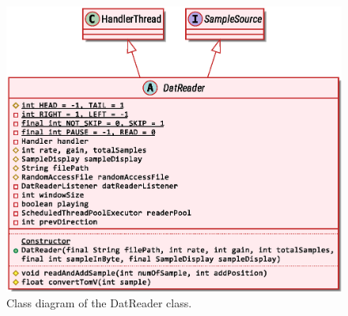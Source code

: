 \begin{figure}[ht!]
	\centering
	\includegraphics[width=130mm]{figures/ch9/5.eps}
	\caption{Class diagram of the DatReader class.}
	\label{fig9.5}
\end{figure}

